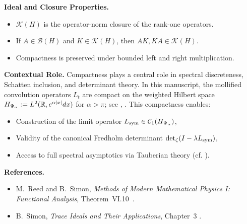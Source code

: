 \begin{definition}
\medskip
\noindent\textbf{Ideal and Closure Properties.}
\begin{itemize}
    \item \( \mathcal{K}(H) \) is the operator-norm closure of the rank-one operators.
    \item If \( A \in \mathcal{B}(H) \) and \( K \in \mathcal{K}(H) \), then \( AK, KA \in \mathcal{K}(H) \).
    \item Compactness is preserved under bounded left and right multiplication.
\end{itemize}

\medskip
\noindent\textbf{Contextual Role.}
Compactness plays a central role in spectral discreteness, Schatten inclusion, and determinant theory. In this manuscript, the mollified convolution operators \( L_t \) are compact on the weighted Hilbert space \( H_{\Psi_\alpha} := L^2(\mathbb{R}, e^{\alpha |x|} dx) \) for \( \alpha > \pi \); see , . This compactness enables:

\begin{itemize}
    \item Construction of the limit operator \( L_{\mathrm{sym}} \in \mathcal{C}_1(H_{\Psi_\alpha}) \),
    \item Validity of the canonical Fredholm determinant \( \det_\zeta(I - \lambda L_{\mathrm{sym}}) \),
    \item Access to full spectral asymptotics via Tauberian theory (cf. ).
\end{itemize}

\medskip
\noindent\textbf{References.}
\begin{itemize}
    \item M.~Reed and B.~Simon, \emph{Methods of Modern Mathematical Physics I: Functional Analysis}, Theorem~VI.10~\cite{ReedSimon1980I}.
    \item B.~Simon, \emph{Trace Ideals and Their Applications}, Chapter~3 \cite{Simon2005TraceIdeals}.
\end{itemize}
\end{definition}
